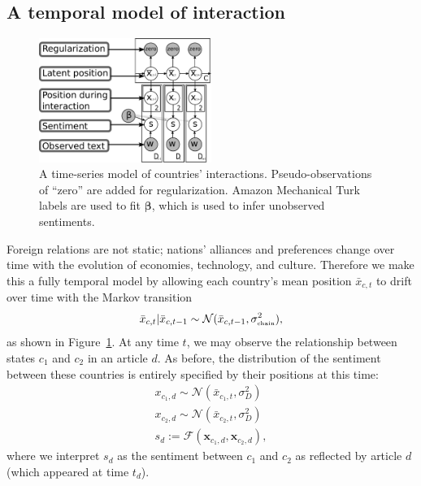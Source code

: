 \subsection{A temporal model of interaction}
\label{sec:fr_time_series_model}
\begin{figure}
  \center
  \includegraphics[width=0.5\textwidth]{chapter_foreign_relations/figures/countries_gm.pdf}
  \caption{A time-series model of countries' interactions.
    Pseudo-observations of ``zero'' are added for regularization.
    Amazon Mechanical Turk labels are used to fit $\bm \beta$, which is
    used to infer unobserved sentiments.}
  \label{fig:fa_gm}
\end{figure}

Foreign relations are not static; nations' alliances and preferences
change over time with the evolution of economies, technology, and
culture.  Therefore we make this a fully temporal model by
allowing each country's mean position $\bar x_{c,t}$ to drift over
time with the Markov transition
\begin{align}
  \label{eq:fr_interaction_position_given_mean}
  \bar x_{c,t} | \bar x_{c,t-1} \sim \mathcal{N}(\bar x_{c,t-1},
  \sigma_{\mbox{\tiny chain}}^2),
\end{align}
as shown in Figure~\ref{fig:fa_gm}. At any time $t$, we may observe
the relationship between states $c_1$ and $c_2$ in an article $d$.  As
before, the distribution of the sentiment between these countries is
entirely specified by their positions at this time:
\begin{align}
  x_{c_1,d} \sim \mathcal{N}(\bar x_{c_1, t}, \sigma_D^2) \nonumber \\
  x_{c_2,d} \sim \mathcal{N}(\bar x_{c_2, t}, \sigma_D^2) \nonumber \\
  s_d := \mathcal{F}(\bm x_{c_1,d}, \bm x_{c_2,d}), \label{eq:sentiment_space}
\end{align}
where we interpret $s_d$ as the sentiment between $c_1$ and $c_2$ as
reflected by article $d$ (which appeared at time $t_d$).

